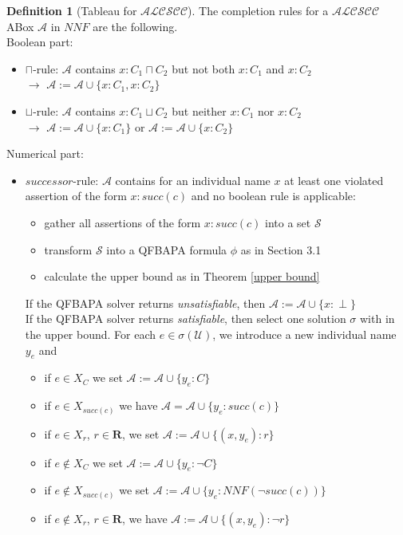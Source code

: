 \documentclass{book}
\theoremstyle{break}
\theoremstyle{definition}
\newtheorem{mydef}{Definition}
\begin{document}
\begin{mydef}[Tableau for $\mathcal{ALCSCC}$]
The completion rules for a $\mathcal{ALCSCC}$ ABox $\mathcal{A}$ in $NNF$ are the following.\\
Boolean part:
\begin{itemize}
\item\label{cap} $\sqcap$-rule: $\mathcal{A}$ contains $x:C_1\sqcap C_2$ but not both $x:C_1$ and $x:C_2$\\
$\rightarrow$ $\mathcal{A}:=\mathcal{A}\cup\{x:C_1, x:C_2\}$
\item\label{cup} $\sqcup$-rule: $\mathcal{A}$ contains $x:C_1\sqcup C_2$ but neither $x:C_1$ nor $x:C_2$\\
$\rightarrow$ $\mathcal{A}:=\mathcal{A}\cup\{x:C_1\}$ or $\mathcal{A}:=\mathcal{A}\cup\{x:C_2\}$
\end{itemize}
Numerical part:
\begin{itemize}
\item\label{succ} $successor$-rule: $\mathcal{A}$ contains for an individual name $x$ at least one violated assertion of the form $x:succ(c)$ and no boolean rule is applicable:
\begin{itemize}
\item gather all assertions of the form $x:succ(c)$ into a set $\mathcal{S}$
\item transform $\mathcal{S}$ into a QFBAPA formula $\phi$ as in Section 3.1
\item calculate the upper bound as in Theorem \ref{upper bound}
\end{itemize}
If the QFBAPA solver returns \textit{unsatisfiable}, then $\mathcal{A}:=\mathcal{A}\cup\{x:\perp\}$\\
If the QFBAPA solver returns \textit{satisfiable}, then select one solution $\sigma$ with in the upper bound. For each $e\in\sigma(\mathcal{U})$, we introduce a new individual name $y_e$ and
\begin{itemize}
\item if $e\in X_C$ we set $\mathcal{A}:=\mathcal{A}\cup\{y_e:C\}$
\item if $e\in X_{succ(c)}$ we have $\mathcal{A}=\mathcal{A}\cup\{y_e:succ(c)\}$
\item if $e\in X_r$, $r\in\mathbf{R}$, we set $\mathcal{A}:=\mathcal{A}\cup\{(x,y_e):r\}$
\item if $e\notin X_C$ we set $\mathcal{A}:=\mathcal{A}\cup\{y_e:\neg C\}$
\item if $e\notin X_{succ(c)}$ we set $\mathcal{A}:=\mathcal{A}\cup\{y_e: NNF(\neg succ(c))\}$
\item if $e\notin X_r$, $r\in\mathbf{R}$, we have $\mathcal{A}:=\mathcal{A}\cup\{(x,y_e):\neg r\}$
\end{itemize}
\end{itemize}
\end{mydef}
\end{document}

